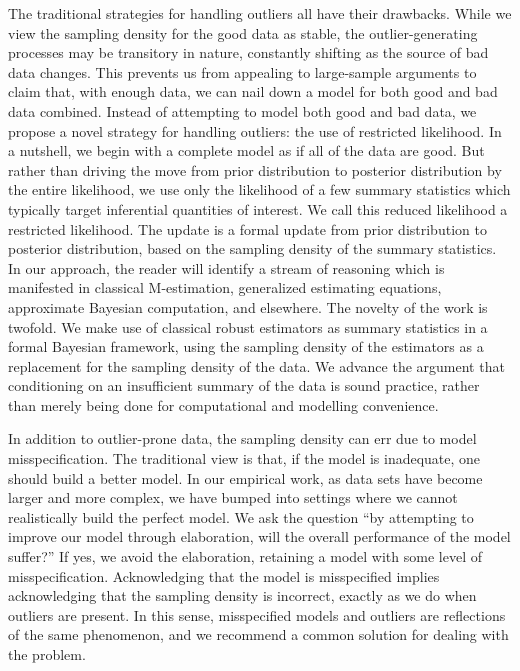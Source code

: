 \documentclass[12pt]{article}
\begin{document}
The traditional strategies for handling outliers all have their drawbacks.  While we view the sampling 
density for the good data as stable, the outlier-generating processes 
may be transitory in nature, constantly shifting as the source of bad data changes.  This prevents
us from appealing to large-sample arguments to claim that, with enough data, we can nail down a
model for both good and bad data combined.  Instead of attempting to model both good and bad
data, we propose a novel strategy for handling outliers:  the use of restricted likelihood.  In a nutshell,
we begin with a complete model   
as if all of the data are good.
But rather than driving the move from prior distribution to posterior
distribution by the entire likelihood, we use only the likelihood of a
few summary statistics which typically target inferential quantities
of interest.  We call this reduced likelihood a restricted likelihood.  The 
update is a formal update from prior distribution to posterior distribution, based on the sampling density
of the summary statistics. 
 In our approach, the reader will identify a stream of reasoning which is manifested in
classical M-estimation, generalized estimating equations, approximate Bayesian computation,
and elsewhere.  The novelty of the work is twofold.  We make use of
classical robust estimators as  summary statistics in a formal
Bayesian framework, using the sampling density of the estimators as a replacement for the 
sampling density of the data.  We advance the argument that conditioning on an insufficient
summary of the data is sound practice, rather than merely being done for computational and 
modelling convenience.  

In addition to outlier-prone data, the sampling density can err due to model misspecification.  
The traditional view is that, if the model is inadequate, one should build a better model.  In our
empirical work, as data sets have become larger and more complex, we have bumped into 
settings where we cannot realistically build the perfect model.  We ask the question ``by attempting
to improve our model through elaboration, will the overall performance of the model suffer?''  If yes,
we avoid the elaboration, retaining a model with some level of misspecification.  Acknowledging that
the model is misspecified implies acknowledging that the sampling density is incorrect, exactly as
we do when outliers are present.  In this sense, misspecified models and outliers are reflections of the
same phenomenon, and we recommend a common solution for dealing with the problem.  
\end{document}
